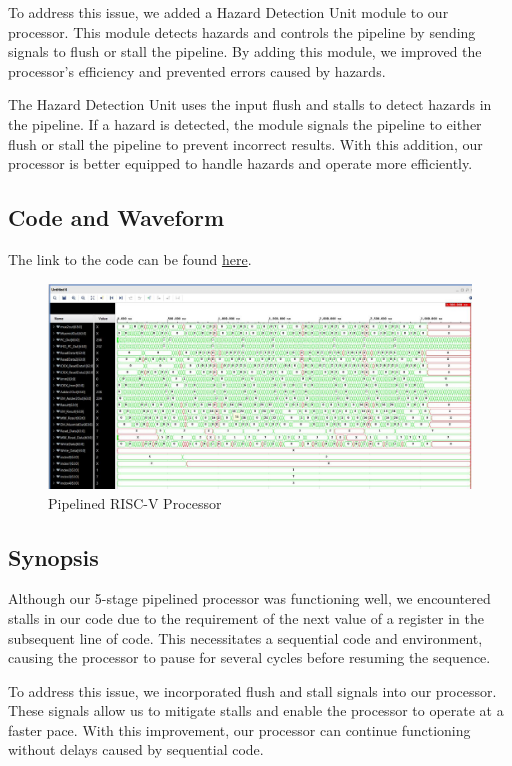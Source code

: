 \documentclass{report}
\theoremstyle{mytheoremstyle}
\theoremstyle{mytheoremstyle}
\theoremstyle{myproblemstyle}
\begin{document}
To address this issue, we added a Hazard Detection Unit module to our processor. This module detects hazards and controls the pipeline by sending signals to flush or stall the pipeline. By adding this module, we improved the processor's efficiency and prevented errors caused by hazards.

The Hazard Detection Unit uses the input flush and stalls to detect hazards in the pipeline. If a hazard is detected, the module signals the pipeline to either flush or stall the pipeline to prevent incorrect results. With this addition, our processor is better equipped to handle hazards and operate more efficiently.

\subsection{Code and Waveform}
The link to the code can be found \href{https://github.com/AliMuhammadAsad/Computer-Architecture-Spring-23/tree/main/RISC_V_Pipelined_Complete}{here}.
\begin{figure}[h]
    \centering
    \includegraphics[scale = 0.5]{Pipelined_RISCV.jpg}
    \caption{Pipelined RISC-V Processor}
    \label{fig: Pipelined RISC_V Processor}
\end{figure}

\subsection{Synopsis}

Although our 5-stage pipelined processor was functioning well, we encountered stalls in our code due to the requirement of the next value of a register in the subsequent line of code. This necessitates a sequential code and environment, causing the processor to pause for several cycles before resuming the sequence.

To address this issue, we incorporated flush and stall signals into our processor. These signals allow us to mitigate stalls and enable the processor to operate at a faster pace. With this improvement, our processor can continue functioning without delays caused by sequential code.
\end{document}
